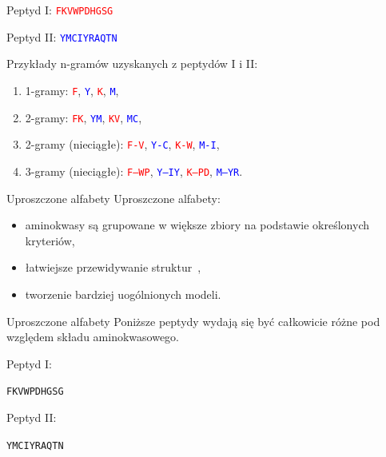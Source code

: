 \documentclass{beamer}\usepackage[]{graphicx}\usepackage[]{color}
\begin{document}
\begin{frame}



Peptyd I: \textcolor{red}{\texttt{FKVWPDHGSG}}

Peptyd II: \textcolor{blue}{\texttt{YMCIYRAQTN}}

\medskip

Przykłady n-gramów uzyskanych z peptydów I i II:

\begin{enumerate}
    \item 1-gramy: \textcolor{red}{\texttt{F}}, \textcolor{blue}{\texttt{Y}}, \textcolor{red}{\texttt{K}}, \textcolor{blue}{\texttt{M}},
    \item 2-gramy: \textcolor{red}{\texttt{FK}}, \textcolor{blue}{\texttt{YM}}, \textcolor{red}{\texttt{KV}}, \textcolor{blue}{\texttt{MC}},
    \item 2-gramy (nieciągłe): \textcolor{red}{\texttt{F-V}}, \textcolor{blue}{\texttt{Y-C}}, \textcolor{red}{\texttt{K-W}}, \textcolor{blue}{\texttt{M-I}},
    \item 3-gramy (nieciągłe): \textcolor{red}{\texttt{F--WP}}, \textcolor{blue}{\texttt{Y--IY}}, \textcolor{red}{\texttt{K--PD}}, \textcolor{blue}{\texttt{M--YR}}.
\end{enumerate}

\end{frame}

\begin{frame}{Uproszczone alfabety}
Uproszczone alfabety:
\begin{itemize}
\item aminokwasy są grupowane w większe zbiory na podstawie 
określonych kryteriów,
\item łatwiejsze przewidywanie struktur~\citep{murphy_simplified_2000},
\item tworzenie bardziej uogólnionych modeli.
\end{itemize}
\end{frame}


\begin{frame}{Uproszczone alfabety}
Poniższe peptydy wydają się być całkowicie różne pod względem składu aminokwasowego.

Peptyd I: 

\texttt{FKVWPDHGSG}

\medskip

Peptyd II: 

\texttt{YMCIYRAQTN}

\end{frame}  
\end{document}
